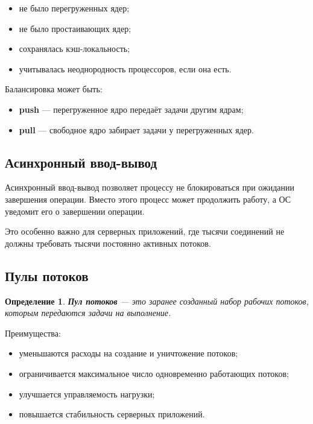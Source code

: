 \documentclass[12pt,a4paper]{article}
\newtheorem{definition}{Определение}
\begin{document}
\begin{itemize}
    \item не было перегруженных ядер;
    \item не было простаивающих ядер;
    \item сохранялась кэш-локальность;
    \item учитывалась неоднородность процессоров, если она есть.
\end{itemize}

Балансировка может быть:

\begin{itemize}
    \item \textbf{push} --- перегруженное ядро передаёт задачи другим ядрам;
    \item \textbf{pull} --- свободное ядро забирает задачи у перегруженных ядер.
\end{itemize}

\subsection{Асинхронный ввод-вывод}

Асинхронный ввод-вывод позволяет процессу не блокироваться при ожидании завершения операции. Вместо этого процесс может продолжить работу, а ОС уведомит его о завершении операции.

Это особенно важно для серверных приложений, где тысячи соединений не должны требовать тысячи постоянно активных потоков.

\subsection{Пулы потоков}

\begin{definition}
\textbf{Пул потоков} --- это заранее созданный набор рабочих потоков, которым передаются задачи на выполнение.
\end{definition}

Преимущества:

\begin{itemize}
    \item уменьшаются расходы на создание и уничтожение потоков;
    \item ограничивается максимальное число одновременно работающих потоков;
    \item улучшается управляемость нагрузки;
    \item повышается стабильность серверных приложений.
\end{itemize}
\end{document}
